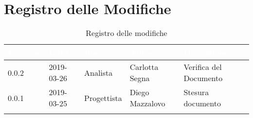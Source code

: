 \newpage

\section*{Registro delle Modifiche}

\begin{center}
\begin{longtable}[c]{|m{}|m{}|m{}|m{}|p{}|}
\hline
\rowcolor{bluelogo}\textbf{\textcolor{white}{Versione}} & \textbf{\textcolor{white}{Data}} & \textbf{\textcolor{white}{Ruolo}} & \textbf{\textcolor{white}{Autore}} & \textbf{\textcolor{white}{Descrizione}}\\
\hline \hline
\endfirsthead
\rowcolor{grigio}0.0.2 & 2019-03-26 & Analista & Carlotta Segna & Verifica del Documento \\
\hline
0.0.1 & 2019-03-25 & Progettista & Diego Mazzalovo & Stesura documento \\
\hline
\caption{Registro delle modifiche}
\end{longtable}
\end{center}
